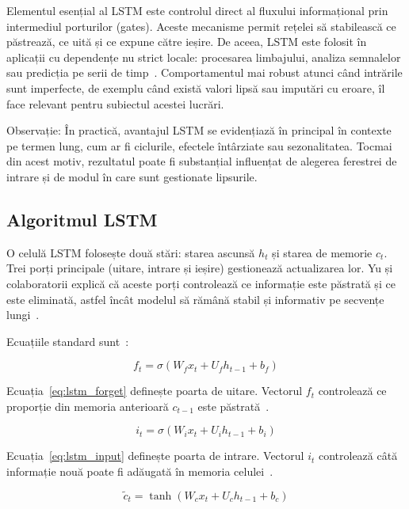 Elementul esențial al LSTM este controlul direct al fluxului informațional prin intermediul porturilor (gates). Aceste mecanisme permit rețelei să stabilească ce păstrează, ce uită și ce expune către ieșire. De aceea, LSTM este folosit în aplicații cu dependențe nu strict locale: procesarea limbajului, analiza semnalelor sau predicția pe serii de timp~\cite{yu2019lstmreview}. Comportamentul mai robust atunci când intrările sunt imperfecte, de exemplu când există valori lipsă sau imputări cu eroare, îl face relevant pentru subiectul acestei lucrări.

Observație: În practică, avantajul LSTM se evidențiază în principal în contexte pe termen lung, cum ar fi ciclurile, efectele întârziate sau sezonalitatea. Tocmai din acest motiv, rezultatul poate fi substanțial influențat de alegerea ferestrei de intrare și de modul în care sunt gestionate lipsurile.

\subsection{Algoritmul LSTM}

O celulă LSTM folosește două stări: starea ascunsă $h_t$ și starea de memorie $c_t$. Trei porți principale (uitare, intrare și ieșire) gestionează actualizarea lor. Yu și colaboratorii explică că aceste porți controlează ce informație este păstrată și ce este eliminată, astfel încât modelul să rămână stabil și informativ pe secvențe lungi~\cite{yu2019lstmreview}. 

Ecuațiile standard sunt~\cite{yu2019lstmreview, hochreiter1997lstm}:

\begin{equation}
f_t = \sigma(W_f x_t + U_f h_{t-1} + b_f)
\label{eq:lstm_forget}
\end{equation}

Ecuația~\ref{eq:lstm_forget} definește poarta de uitare. Vectorul $f_t$ controlează ce proporție din memoria anterioară $c_{t-1}$ este păstrată~\cite{yu2019lstmreview, hochreiter1997lstm}.

\begin{equation}
i_t = \sigma(W_i x_t + U_i h_{t-1} + b_i)
\label{eq:lstm_input}
\end{equation}

Ecuația~\ref{eq:lstm_input} definește poarta de intrare. Vectorul $i_t$ controlează câtă informație nouă poate fi adăugată în memoria celulei~\cite{yu2019lstmreview, hochreiter1997lstm}.

\begin{equation}
\tilde{c}_t = \tanh(W_c x_t + U_c h_{t-1} + b_c)
\label{eq:lstm_candidate}
\end{equation}

